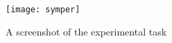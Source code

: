 \begin{figure}[!ht]
\centering
\texttt{[image: symper]}
\caption{A screenshot of the experimental task}
\label{screenshot}
\end{figure}